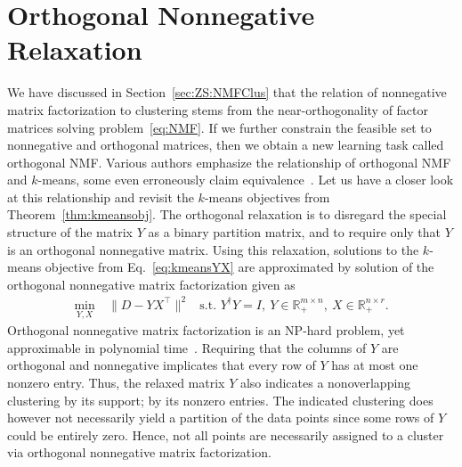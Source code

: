 \section{Orthogonal Nonnegative  Relaxation}\label{sec:ZS:OrthogonalRelaxation} 
We have discussed in Section~\ref{sec:ZS:NMFClus} that the relation of nonnegative matrix factorization to clustering stems from the near-orthogonality of factor matrices solving problem~\eqref{eq:NMF}. If we further constrain the feasible set to nonnegative and orthogonal  matrices, then we obtain a new learning task called orthogonal NMF.
Various authors emphasize the relationship of orthogonal NMF and $k$-means, some even erroneously claim equivalence~\citep{ding2005equivalence, ding2006orthogonal, li2006relationships}. Let us have a closer look at this relationship and revisit the $k$-means objectives from Theorem~\ref{thm:kmeansobj}. The orthogonal relaxation is to disregard the special structure of the matrix $Y$ as a binary partition matrix, and to require only that $Y$ is an orthogonal nonnegative matrix. Using this relaxation, solutions to the $k$-means objective from Eq.~\eqref{eq:kmeansYX} are approximated by solution of the orthogonal nonnegative matrix factorization given as
\begin{align}\label{eq:ONMF}
    \min_{Y,X} &\ \|D-YX^\top\|^2 &\text{s.t. } Y^\dagger Y=I,\  Y\in\mathbb{R}_+^{m\times n},\  X\in\mathbb{R}_+^{n\times r}.
\end{align}
Orthogonal nonnegative matrix factorization is an NP-hard problem, yet approximable in polynomial time~\cite{asteris2015orthogonal}.
Requiring that the columns of $Y$ are orthogonal and nonnegative implicates that every row of $Y$ has at most one nonzero entry. Thus, the relaxed matrix $Y$ also indicates a nonoverlapping clustering by its support; by its nonzero entries. The indicated clustering does however not necessarily yield a partition of the data points since some rows of $Y$ could be entirely zero. Hence, not all points are necessarily assigned to a cluster via orthogonal nonnegative matrix factorization.

